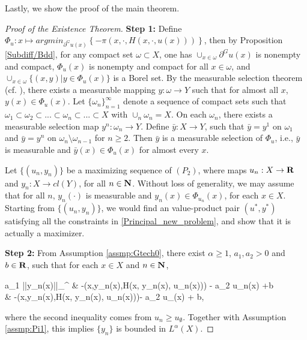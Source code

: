 Lastly, we show the proof of the main theorem.\medskip

\begin{proof}[Proof of the Existence Theorem]
	{\bf Step 1:} 	 Define $\Phi_u: x \longmapsto argmin_{\partial^G u(x)} \left\{-\pi(x, \cdot, H(x,\cdot,u(x)))\right\}$, then by Proposition \ref{Subdiff/Bdd}, for any compact set $\omega \subset X$, one has $\cup_{x \in \omega} \partial^G u(x)$ is nonempty and compact, $\Phi_u(x)$ is nonempty and compact for all $x\in \omega$, and $\cup_{x \in \omega} \{(x, y)| y \in \Phi_u(x)\}$ is a Borel set. By the measurable selection theorem (cf. \cite[Theorem 1.2, Chapter VIII]{EkelandTemam76}), there exists a measurable mapping $y: \omega \rightarrow Y$ such that for almost all $x$, $y(x) \in \Phi_u(x)$. Let $\{\omega_n\}_{n=1}^{\infty}$ denote a sequence of compact sets such that $\omega_1 \subset \omega_2 \subset ... \subset \omega_n \subset ...\subset X$ with $\cup_{n}\omega_n = X$. On each $\omega_n$, there exists a measurable selection map $y^n: \omega_n \rightarrow Y$. Define $\bar{y}: X \rightarrow Y$, such that $\bar{y} = y^1$ on $\omega_1$ and $\bar{y} = y^n$ on $\omega_n\setminus \omega_{n-1}$ for $n \ge 2$. Then $\bar{y}$ is a measurable selection of $\Phi_u$, i.e., $\bar{y}$ is measurable and $\bar{y}(x)\in \Phi_u(x)$ for almost every $x$. 
	
	
	
	Let $\{(u_n, y_n)\}$ be a maximizing sequence of $(P_2)$, where maps $u_n: X\rightarrow {\mathbf R}$ and $y_n: X\rightarrow cl(Y)$, for all $n\in \mathbf{N}$. Without loss of generality, we may assume that for all $n$, $y_n(\cdot)$ is measurable and $y_n(x) \in \Phi_{u_n}(x)$, for each $x\in X$. Starting from $\{(u_n, y_n)\}$, we would find an value-product pair $(u^*, y^*)$ satisfying all the constraints in \eqref{Principal_new_problem}, and show that it is actually a maximizer.\medskip
	
	{\bf Step 2:} From Assumption \ref{assmp:Gtech0}, there exist $\alpha \ge 1$, $a_1, a_2> 0$ and $b\in {\mathbf R}$,  such that for each $x\in X$ and $n \in \mathbf{N}$,
	\begin{flalign*}
	a_1 ||y_n(x)||_{\alpha}^{\alpha} \le & -\pi(x,y_n(x),H(x, y_n(x), u_n(x))) - a_2 u_n(x) +b \\
	\le &  -\pi(x,y_n(x),H(x, y_n(x), u_n(x)))- a_2 u_{\emptyset}(x) + b,
	\end{flalign*}
	where the second inequality comes from $u_n\ge u_{\emptyset}$. Together with Assumption \ref{assmp:Pi1}, this implies $\{y_n\}$ is bounded in $L^{\alpha}(X)$.
	


\end{proof}

